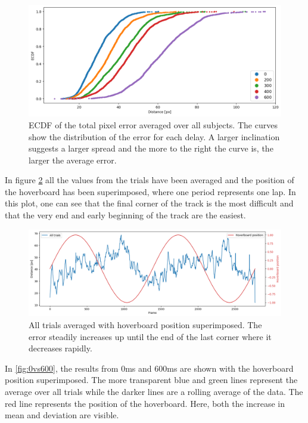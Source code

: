 \documentclass[nofilelist]{cslthse-msc}
\begin{document}
\begin{figure}[!hbt]
   \centering
   \includegraphics[scale=0.5]{images/ecdf.png} 
   \caption{ECDF of the total pixel error averaged over all subjects. The curves show the distribution of the error for each delay. A larger inclination suggests a larger spread and the more to the right the curve is, the larger the average error.}
   \label{fig:ecdf}
\end{figure}

In figure \ref{fig:hoverboard-pos} all the values from the trials have been averaged and the position of the hoverboard has been superimposed, where one period represents one lap. In this plot, one can see that the final corner of the track is the most difficult and that the very end and early beginning of the track are the easiest. 

\begin{figure}[!hbt]
   \centering
   \includegraphics[scale=0.4]{images/hoverboard-pos.png} 
   \caption{All trials averaged with hoverboard position superimposed. The error steadily increases up until the end of the last corner where it decreases rapidly.}
   \label{fig:hoverboard-pos}
\end{figure}

In \ref{fig:0vs600}, the results from 0ms and 600ms are shown with the hoverboard position superimposed. The more transparent blue and green lines represent the average over all trials while the darker lines are a rolling average of the data. The red line represents the position of the hoverboard. Here, both the increase in mean and deviation are visible. 
\end{document}
